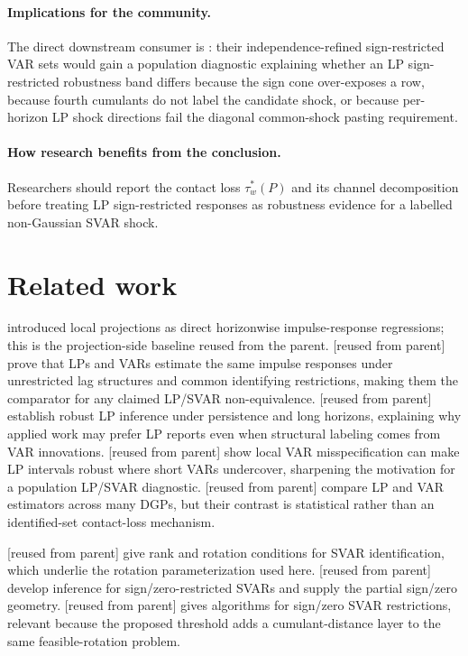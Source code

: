 \documentclass[11pt]{article}
\theoremstyle{definition}
\theoremstyle{plain}
\theoremstyle{remark}
\begin{document}
\paragraph{Implications for the community.}
The direct downstream consumer is \citet{DrautzburgWright2023}: their independence-refined sign-restricted VAR sets would gain a population diagnostic explaining whether an LP sign-restricted robustness band differs because the sign cone over-exposes a row, because fourth cumulants do not label the candidate shock, or because per-horizon LP shock directions fail the diagonal common-shock pasting requirement.

\paragraph{How research benefits from the conclusion.}
Researchers should report the contact loss \(\tau_w^*(P)\) and its channel decomposition before treating LP sign-restricted responses as robustness evidence for a labelled non-Gaussian SVAR shock.

\section{Related work}
\citet{Jorda2005} introduced local projections as direct horizonwise impulse-response regressions; this is the projection-side baseline reused from the parent.  \citet[abstract and pp.~955--980]{PlagborgMollerWolf2021} [reused from parent] prove that LPs and VARs estimate the same impulse responses under unrestricted lag structures and common identifying restrictions, making them the comparator for any claimed LP/SVAR non-equivalence.  \citet{MontielOleaPlagborgMoller2021} [reused from parent] establish robust LP inference under persistence and long horizons, explaining why applied work may prefer LP reports even when structural labeling comes from VAR innovations.  \citet{MontielOleaPlagborgMollerQianWolf2024} [reused from parent] show local VAR misspecification can make LP intervals robust where short VARs undercover, sharpening the motivation for a population LP/SVAR diagnostic.  \citet{LiPlagborgMollerWolf2024} [reused from parent] compare LP and VAR estimators across many DGPs, but their contrast is statistical rather than an identified-set contact-loss mechanism.

\citet{RubioRamirezWaggonerZha2010} [reused from parent] give rank and rotation conditions for SVAR identification, which underlie the rotation parameterization used here.  \citet{AriasRubioRamirezWaggoner2018} [reused from parent] develop inference for sign/zero-restricted SVARs and supply the partial sign/zero geometry.  \citet[Section~4 and Algorithm~4.1]{Read2022} [reused from parent] gives algorithms for sign/zero SVAR restrictions, relevant because the proposed threshold adds a cumulant-distance layer to the same feasible-rotation problem.
\end{document}
